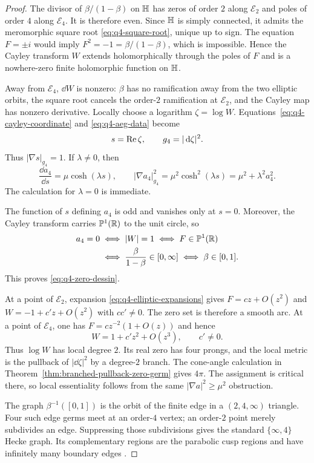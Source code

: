 \begin{proof}
The divisor of $\beta/(1-\beta)$ on $\mathbb{H}$ has zeros of order $2$ along
$\mathcal E_2$ and poles of order $4$ along $\mathcal E_4$.  It is therefore
even.  Since $\mathbb{H}$ is simply connected, it admits the meromorphic square root
\eqref{eq:q4-square-root}, unique up to sign.  The equation $F=\pm i$ would imply
$F^2=-1=\beta/(1-\beta)$, which is impossible.  Hence the Cayley transform $W$
extends holomorphically through the poles of $F$ and is a nowhere-zero finite
holomorphic function on $\mathbb{H}$.

Away from $\mathcal E_4$, $\dd W$ is nonzero: $\beta$ has no ramification away
from the two elliptic orbits, the square root cancels the order-$2$ ramification
at $\mathcal E_2$, and the Cayley map has nonzero derivative.  Locally choose a
logarithm $\zeta=\log W$.  Equations~\eqref{eq:q4-cayley-coordinate} and
\eqref{eq:q4-aeg-data} become
\[
 s=\operatorname{Re}\zeta,
 \qquad g_4=|\,\mathrm{d}\zeta|^2.
\]
Thus $|\nabla s|_{g_4}=1$.  If $\lambda\ne0$, then
\[
 \frac{\dd a_4}{\dd s}=\mu\cosh(\lambda s),
 \qquad
 |\nabla a_4|_{g_4}^2
 =\mu^2\cosh^2(\lambda s)
 =\mu^2+\lambda^2a_4^2.
\]
The calculation for $\lambda=0$ is immediate.

The function of $s$ defining $a_4$ is odd and vanishes only at $s=0$.  Moreover,
the Cayley transform carries $\mathbb P^1(\mathbb{R})$ to the unit circle, so
\begin{align*}
 a_4=0
 &\iff |W|=1
 \iff F\in\mathbb P^1(\mathbb{R})\\
 &\iff \frac{\beta}{1-\beta}\in[0,\infty]
 \iff \beta\in[0,1].
\end{align*}
This proves \eqref{eq:q4-zero-dessin}.

At a point of $\mathcal E_2$, expansion
\eqref{eq:q4-elliptic-expansions} gives $F=c z+O(z^2)$ and
$W=-1+c'z+O(z^2)$ with $cc'\ne0$.  The zero set is therefore a smooth arc.
At a point of $\mathcal E_4$, one has
$F=c z^{-2}(1+O(z))$ and hence
\[
 W=1+c'z^2+O(z^3),
 \qquad c'\ne0.
\]
Thus $\log W$ has local degree $2$.  Its real zero has four prongs, and the local
metric is the pullback of $|\dd\zeta|^2$ by a degree-$2$ branch.  The cone-angle
calculation in Theorem~\ref{thm:branched-pullback-zero-germ} gives $4\pi$.
The assignment is critical there, so local essentiality follows from the same
$|\nabla a|^2\ge\mu^2$ obstruction.

The graph $\beta^{-1}([0,1])$ is the orbit of the finite edge in a
$(2,4,\infty)$ triangle.  Four such edge germs meet at an order-$4$ vertex; an
order-$2$ point merely subdivides an edge.  Suppressing those subdivisions gives
the standard $\{\infty,4\}$ Hecke graph.  Its complementary regions are the
parabolic cusp regions and have infinitely many boundary edges
\cite{LangLang2016HeckeGroups}.


\end{proof}
